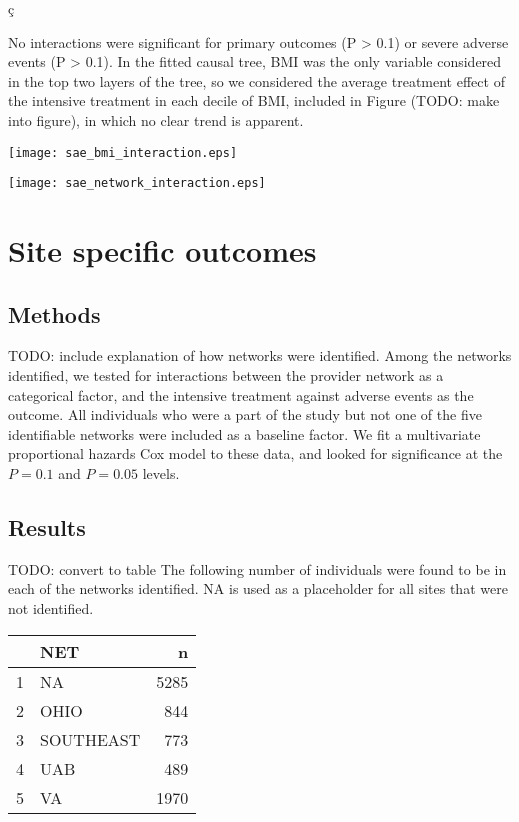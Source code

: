ç\documentclass[10pt]{article}
\begin{document}
No interactions were significant for primary outcomes (P > 0.1) or severe
adverse events (P > 0.1). In the fitted causal tree, BMI was the only variable
considered in the top two layers of the tree, so we considered the average
treatment effect of the intensive treatment in each decile of BMI, included in
Figure (TODO: make into figure), in which no clear trend is apparent. 

\texttt{[image: sae\_bmi\_interaction.eps]}

\texttt{[image: sae\_network\_interaction.eps]}

\section{Site specific outcomes}
\subsection{Methods}
TODO: include explanation of how networks were identified.
Among the networks identified, we tested for interactions between the provider
network as a categorical factor, and the intensive treatment against adverse
events as the outcome. All individuals who were a part of the study but not one
of the five identifiable networks were included as a baseline factor. We fit a
multivariate proportional hazards Cox model to these data, and looked for
significance at the $P = 0.1$ and $P=0.05$ levels.

\subsection{Results}
TODO: convert to table
The following number of individuals were found to be in each of the networks
identified. NA is used as a placeholder for all sites that were not identified.

\begin{center}
\begin{tabular}{ |c|l|r| } 
 \hline
 &      \textbf{NET}&   \textbf{n} \\
 \hline
1&       NA&5285 \\
 \hline
2&     OHIO& 844 \\
 \hline
3&SOUTHEAST& 773 \\
 \hline
4      &UAB& 489 \\
 \hline
5      & VA&1970 \\
 \hline
\end{tabular}
\end{center}
\end{document}

